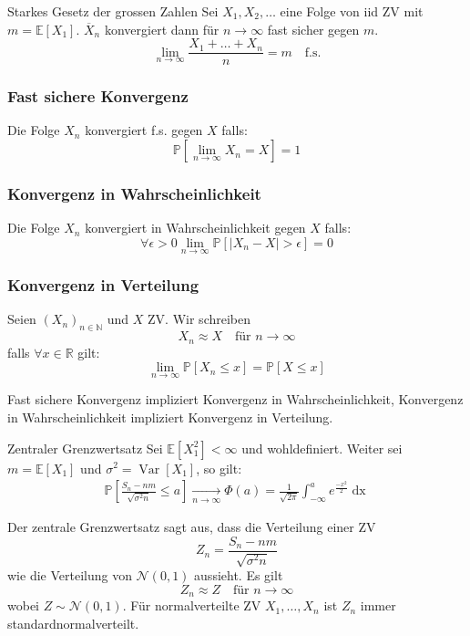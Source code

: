 \documentclass[a4paper,10pt]{article}
\def\R{\mathbb{R}}
\def\P{\mathbb{P}}
\def\E{\mathbb{E}}
\DeclareMathOperator{\Var}{\text{Var}}
\begin{document}
\begin{mainbox}{Starkes Gesetz der grossen Zahlen}
	Sei $X_1, X_2, \ldots$ eine Folge von iid ZV mit $m = \E[X_1]$. $\overline{X}_n$ konvergiert dann für $n \to \infty$ fast sicher gegen $m$.
	$$
	\lim_{n\to \infty} \frac{X_1 + \ldots + X_n}{n} = m \quad \text{f.s.}
	$$
\end{mainbox}

\subsubsection*{Fast sichere Konvergenz}

Die Folge $X_n$ konvergiert f.s. gegen $X$ falls:
$$
	\P \left[ \lim_{n \to \infty} X_n = X \right] = 1
$$

\subsubsection*{Konvergenz in Wahrscheinlichkeit}

Die Folge $X_n$ konvergiert in Wahrscheinlichkeit gegen $X$ falls:
$$
	\forall \epsilon > 0 \lim_{n \to \infty} \P \left[ \left| X_n - X \right| > \epsilon \right] = 0
$$

\subsubsection*{Konvergenz in Verteilung}
Seien \((X_n)_{n\in \mathbb{N}}\) und \(X\) ZV. Wir schreiben
\[X_n \approx X \quad \text{für } n \to \infty\]
falls \(\forall x \in \R\) gilt:
\[\lim_{n\to\infty} \P[X_n \le x] = \P[X \le x ]\]

Fast sichere Konvergenz impliziert Konvergenz in Wahrscheinlichkeit, Konvergenz in Wahrscheinlichkeit impliziert Konvergenz in Verteilung.

\begin{mainbox}{Zentraler Grenzwertsatz}
	Sei \(\E[X^2_1] < \infty\) und wohldefiniert. Weiter sei \(m = \E[X_1]\) und \(\sigma^2 = \Var[X_1]\), so gilt:
	\begin{align*}
		\P\left[\frac{S_n - nm}{\sqrt{\sigma^2 n}} \leq a\right] \xrightarrow[n \to \infty]{} \Phi(a) = \frac{1}{\sqrt{2 \pi}} \int_{-\infty}^a e^{\frac{-x^2}{2}} \mathop{dx}
	\end{align*}
\end{mainbox}
Der zentrale Grenzwertsatz sagt aus, dass die Verteilung einer ZV
\[Z_n = \frac{S_n - nm}{\sqrt{\sigma^2 n}}\]
wie die Verteilung von \(\mathcal{N}(0,1)\) aussieht. Es gilt
\[Z_n \approx Z \quad \text{für } n\to \infty\]
wobei \(Z \sim \mathcal{N}(0,1)\). Für normalverteilte ZV \(X_1, \ldots, X_n\) ist \(Z_n\) immer standardnormalverteilt.
\end{document}
